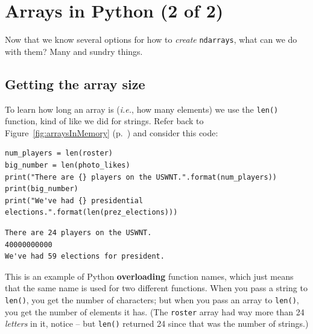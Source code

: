 


\chapter{Arrays in Python (2 of 2)}


Now that we know several options for how to \textit{create} \texttt{ndarrays},
what can we do with them? Many and sundry things.

\section{Getting the array size}

To learn how long an array is (\textit{i.e.}, how many elements) we use the
\texttt{len()} function, kind of like we did for strings. Refer back to
Figure~\ref{fig:arraysInMemory} (p.~\pageref{fig:arraysInMemory}) and consider
this code:

\begin{Verbatim}[fontsize=\small,samepage=true,frame=single,framesep=3mm]
num_players = len(roster)
big_number = len(photo_likes)
print("There are {} players on the USWNT.".format(num_players))
print(big_number)
print("We've had {} presidential elections.".format(len(prez_elections)))
\end{Verbatim}

\begin{Verbatim}[fontsize=\small,samepage=true,frame=single,framesep=3mm]
There are 24 players on the USWNT.
40000000000
We've had 59 elections for president.
\end{Verbatim}

This is an example of Python \textbf{overloading} function names, which just
means that the same name is used for two different functions. When you pass a
string to \texttt{len()}, you get the number of characters; but when you pass
an array to \texttt{len()}, you get the number of elements it has.
(The \texttt{roster} array had way more than 24 \textit{letters} in it, notice
-- but \texttt{len()} returned 24 since that was the number of strings.)

